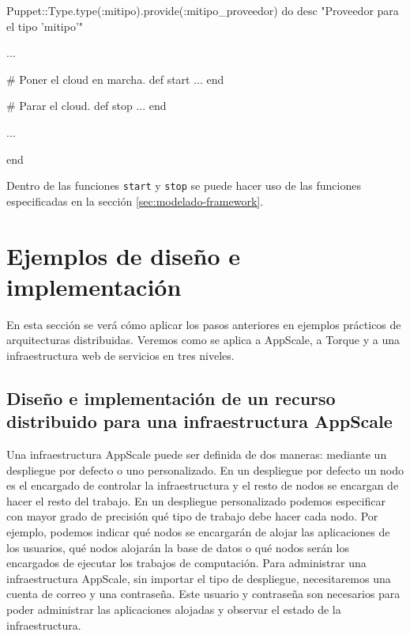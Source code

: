 \begin{rubycode}
Puppet::Type.type(:mitipo).provide(:mitipo_proveedor) do
   desc "Proveedor para el tipo 'mitipo'"

   ...

   # Poner el cloud en marcha.
   def start
      ...
   end

   # Parar el cloud.
   def stop
      ...
   end
   
   ...
   
end
\end{rubycode}

Dentro de las funciones \texttt{start} y \texttt{stop} se puede hacer uso de las funciones especificadas en la sección \ref{sec:modelado-framework}.

\section{Ejemplos de diseño e implementación}

En esta sección se verá cómo aplicar los pasos anteriores en ejemplos prácticos de arquitecturas distribuidas. Veremos como se aplica a AppScale, a Torque y a una infraestructura web de servicios en tres niveles.

\subsection{Diseño e implementación de un recurso distribuido para una infraestructura AppScale}

Una infraestructura AppScale puede ser definida de dos maneras: mediante un despliegue por defecto o uno personalizado. En un despliegue por defecto un nodo es el encargado de controlar la infraestructura y el resto de nodos se encargan de hacer el resto del trabajo. En un despliegue personalizado podemos especificar con mayor grado de precisión qué tipo de trabajo debe hacer cada nodo. Por ejemplo, podemos indicar qué nodos se encargarán de alojar las aplicaciones de los usuarios, qué nodos alojarán la base de datos o qué nodos serán los encargados de ejecutar los trabajos de computación. Para administrar una infraestructura AppScale, sin importar el tipo de despliegue, necesitaremos una cuenta de correo y una contraseña. Este usuario y contraseña son necesarios para poder administrar las aplicaciones alojadas y observar el estado de la infraestructura. \\


